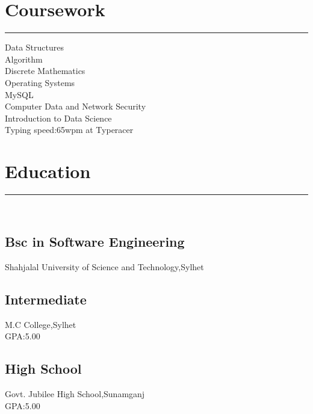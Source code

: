 \documentclass[]{rahulworld-resume}
\begin{document}
\begin{minipage}[t]{0.33\textwidth}
\sectionsep
\section{Coursework}
\noindent\rule{5cm}{0.4pt}

Data Structures\\
Algorithm\\
Discrete Mathematics\\
Operating Systems\\
MySQL\\
Computer Data and Network Security\\
Introduction to Data Science\\
Typing speed:65wpm at Typeracer\\
\sectionsep
\section{Education} 
\noindent\rule{5cm}{0.4pt}\\
\subsection{Bsc in Software Engineering}
Shahjalal University of Science and Technology,Sylhet \\

\vspace{8pt}
\subsection{Intermediate}
M.C College,Sylhet\\
GPA:5.00

\vspace{8pt}
\subsection{High School}
Govt. Jubilee High School,Sunamganj\\
GPA:5.00
\sectionsep
%
%

\end{minipage} 
\hfill
\end{document}

